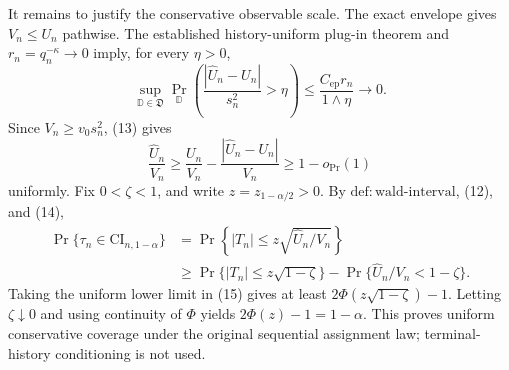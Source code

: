 It remains to justify the conservative observable scale. The exact envelope gives \(V_n\le U_n\) pathwise. The established history-uniform plug-in theorem and \(r_n=q_n^{-\kappa}\to0\) imply, for every \(\eta>0\),
\[
\sup_{\mathbb D\in\mathfrak D}
\Pr_{\mathbb D}\left(\frac{|\widehat U_n-U_n|}{s_n^2}>\eta\right)
\le\frac{C_{\mathrm{ep}}r_n}{1\wedge\eta}\longrightarrow0.
\tag{13}
\]
Since \(V_n\ge v_0s_n^2\), (13) gives
\[
\frac{\widehat U_n}{V_n}
\ge\frac{U_n}{V_n}-\frac{|\widehat U_n-U_n|}{V_n}
\ge1-o_{\Pr}(1)
\tag{14}
\]
uniformly. Fix \(0<\zeta<1\), and write \(z=z_{1-\alpha/2}>0\). By \(\mathrm{def:wald\text{-}interval}\), (12), and (14),
\[
\begin{aligned}
\Pr\{\tau_n\in\mathrm{CI}_{n,1-\alpha}\}
&=\Pr\left\{|T_n|\le z\sqrt{\widehat U_n/V_n}\right\}\\
&\ge\Pr\{|T_n|\le z\sqrt{1-\zeta}\}
-\Pr\{\widehat U_n/V_n<1-\zeta\}.
\end{aligned}
\tag{15}
\]
Taking the uniform lower limit in (15) gives at least
\(2\Phi(z\sqrt{1-\zeta})-1\). Letting \(\zeta\downarrow0\) and using continuity of \(\Phi\) yields \(2\Phi(z)-1=1-\alpha\). This proves uniform conservative coverage under the original sequential assignment law; terminal-history conditioning is not used.